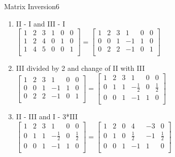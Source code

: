 \begin{questions}
\begin{question}{Matrix Inversion}{6}
\begin{answer}
	\begin{enumerate}
		\item II - I and III - I\\
		\bigskip
		$	
		\left[\begin{array}{ccc|ccc}
			1 & 2 & 3 & 1&0&0    \\       
			1 & 2 & 4 & 0&1&0    \\       
			1 & 4 & 5 & 0&0&1     \\      
		\end{array} \right] =
		\left[\begin{array}{ccc|ccc}
		1 & 2 & 3 & 1&0&0    \\       
		0& 0 & 1 & -1&1&0    \\       
		0& 2 & 2 & -1&0&1     \\      
		\end{array} \right]
		$
		
		\item III divided by 2  and change of II with III \\
		\bigskip
		$	
		\left[\begin{array}{ccc|ccc}
		1 & 2 & 3 & 1&0&0    \\       
		0& 0 & 1 & -1&1&0    \\       
		0& 2 & 2 & -1&0&1     \\      
		\end{array} \right] =
		\left[\begin{array}{ccc|ccc}
		1 & 2 & 3 & 1&0&0    \\       
		0& 1 & 1 & -\frac{1}{2}&0&\frac{1}{2}    \\       
		0& 0 & 1 & -1&1&0     \\      
		\end{array} \right]
		$
		
		\item II - III and I - 3*III \\
		\bigskip
		$	
		\left[\begin{array}{ccc|ccc}
		1 & 2 & 3 & 1&0&0    \\       
		0& 1 & 1 & -\frac{1}{2}&0&\frac{1}{2}    \\       
		0& 0 & 1 & -1&1&0     \\      
		\end{array} \right] =
		\left[\begin{array}{ccc|ccc}
		1 & 2 & 0 & 4&-3&0    \\       
		0& 1 & 0 & \frac{1}{2}&-1&\frac{1}{2}    \\       
		0& 0 & 1 & -1&1&0     \\      
		\end{array} \right]
		$
		

\end{enumerate}
\end{answer}
\end{question}
\end{questions}
